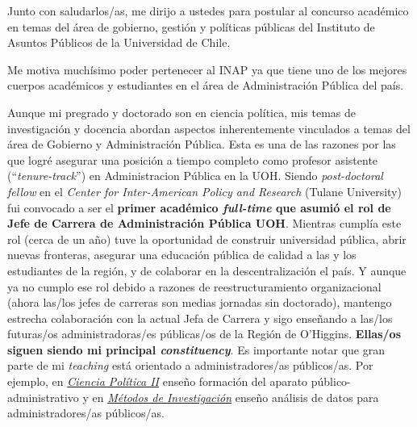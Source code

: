 \documentclass[12pt,stdletter,dateno,sigleft]{newlfm} %
\begin{document}
\begin{newlfm}


Junto con saludarlos/as, me dirijo a ustedes para postular al concurso acad\'emico en temas del \'area de gobierno, gesti\'on y pol\'iticas p\'ublicas del Instituto de Asuntos P\'ublicos de la Universidad de Chile. 



Me motiva much\'isimo poder pertenecer al INAP ya que tiene uno de los mejores cuerpos acad\'emicos y estudiantes en el \'area de Administraci\'on P\'ublica del pa\'is. 

Aunque mi pregrado y doctorado son en ciencia pol\'itica, mis temas de investigaci\'on y docencia abordan aspectos inherentemente vinculados a temas del \'area de Gobierno y Administraci\'on P\'ublica. Esta es una de las razones por las que logr\'e asegurar una posici\'on a tiempo completo como profesor asistente (``\emph{tenure-track}'') en Administracion P\'ublica en la UOH. Siendo \emph{post-doctoral fellow} en el \emph{Center for Inter-American  Policy and Research} (Tulane University) fui convocado a ser el {\bf primer acad\'emico \emph{full-time} que asumi\'o el rol de Jefe de Carrera de Administraci\'on P\'ublica UOH}. Mientras cumpl\'ia este rol (cerca de un a\~no) tuve la oportunidad de construir universidad p\'ublica, abrir nuevas fronteras, asegurar una educaci\'on p\'ublica de calidad a las y los estudiantes de la regi\'on, y de colaborar en la descentralizaci\'on el pa\'is. Y aunque ya no cumplo ese rol debido a razones de reestructuramiento organizacional (ahora las/los jefes de carreras son medias jornadas sin doctorado), mantengo estrecha colaboraci\'on con la actual Jefa de Carrera y sigo ense\~nando a las/los futuras/os administradoras/es p\'ublicas/os de la Regi\'on de O'Higgins. {\bf Ellas/os siguen siendo mi principal \emph{constituency}}. Es importante notar que gran parte de mi \emph{teaching} est\'a orientado a administradores/as p\'ublicos/as. Por ejemplo, en \href{https://github.com/hbahamonde/Ciencia_Politica_I/raw/master/Bahamonde_Ciencia_Politica_I.pdf}{\emph{Ciencia Pol\'itica II}} ense\~no formaci\'on del aparato p\'ublico-administrativo y en \href{https://github.com/hbahamonde/Ciencia_Politica_I/raw/master/Bahamonde_Ciencia_Politica_I.pdf}{\emph{M\'etodos de Investigaci\'on}} ense\~no an\'alisis de datos para administradores/as p\'ublicos/as.



\end{newlfm}
\end{document}
